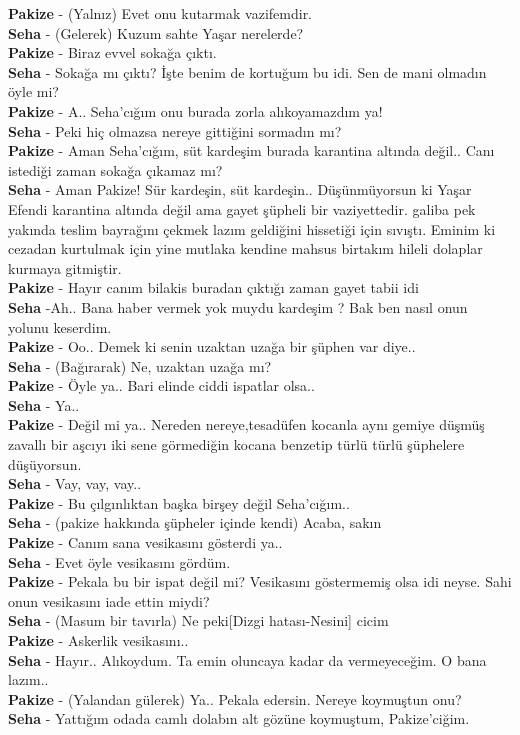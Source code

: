 \documentclass[]{book}
\begin{document}
\textbf{Pakize} - (Yalnız) Evet onu kutarmak vazifemdir.\\
\textbf{Seha} - (Gelerek) Kuzum sahte Yaşar nerelerde?\\
\textbf{Pakize} - Biraz evvel sokağa çıktı.\\
\textbf{Seha} - Sokağa mı çıktı? İşte benim de kortuğum bu idi. Sen de mani olmadın öyle mi?\\
\textbf{Pakize} - A.. Seha'cığım onu burada zorla alıkoyamazdım ya!\\
\textbf{Seha} - Peki hiç olmazsa nereye gittiğini sormadın mı?\\
\textbf{Pakize} - Aman Seha'cığım, süt kardeşim burada karantina altında değil.. Canı istediği zaman sokağa çıkamaz mı?\\
\textbf{Seha} - Aman Pakize! Sür kardeşin, süt kardeşin.. Düşünmüyorsun ki Yaşar Efendi karantina altında değil ama gayet şüpheli bir vaziyettedir. galiba pek yakında teslim bayrağını çekmek lazım geldiğini hissetiği için sıvıştı. Eminim ki cezadan kurtulmak için yine mutlaka kendine mahsus birtakım hileli dolaplar kurmaya gitmiştir.\\
\textbf{Pakize} - Hayır canım bilakis buradan çıktığı zaman gayet tabii idi\\
\textbf{Seha} -Ah.. Bana haber vermek yok muydu kardeşim ? Bak ben nasıl onun yolunu keserdim.\\
\textbf{Pakize} - Oo.. Demek ki senin uzaktan uzağa bir şüphen var diye..\\
\textbf{Seha} - (Bağırarak) Ne, uzaktan uzağa mı?\\
\textbf{Pakize} - Öyle ya.. Bari elinde ciddi ispatlar olsa..\\
\textbf{Seha} - Ya..\\
\textbf{Pakize} - Değil mi ya.. Nereden nereye,tesadüfen kocanla aynı gemiye düşmüş zavallı bir aşcıyı iki sene görmediğin kocana benzetip türlü türlü şüphelere düşüyorsun.\\
\textbf{Seha} - Vay, vay, vay..\\
\textbf{Pakize} - Bu çılgınlıktan başka birşey değil Seha'cığım..\\
\textbf{Seha} - (pakize hakkında şüpheler içinde kendi) Acaba, sakın\\
\textbf{Pakize} - Canım sana vesikasını gösterdi ya..\\
\textbf{Seha} - Evet öyle vesikasını gördüm.\\
\textbf{Pakize} - Pekala bu bir ispat değil mi? Vesikasını göstermemiş olsa idi neyse. Sahi onun vesikasını iade ettin miydi?\\
\textbf{Seha} - (Masum bir tavırla) Ne peki{[}Dizgi hatası-Nesini{]} cicim\\
\textbf{Pakize} - Askerlik vesikasını..\\
\textbf{Seha} - Hayır.. Alıkoydum. Ta emin oluncaya kadar da vermeyeceğim. O bana lazım..\\
\textbf{Pakize} - (Yalandan gülerek) Ya.. Pekala edersin. Nereye koymuştun onu?\\
\textbf{Seha} - Yattığım odada camlı dolabın alt gözüne koymuştum, Pakize'ciğim.\\
\end{document}
